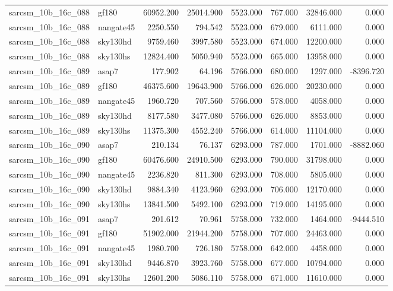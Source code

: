 \begin{tabular}{llrrrrrr}
sarcsm\_10b\_16c\_088 & gf180 & 60952.200 & 25014.900 & 5523.000 & 767.000 & 32846.000 & 0.000 \\
sarcsm\_10b\_16c\_088 & nangate45 & 2250.550 & 794.542 & 5523.000 & 679.000 & 6111.000 & 0.000 \\
sarcsm\_10b\_16c\_088 & sky130hd & 9759.460 & 3997.580 & 5523.000 & 674.000 & 12200.000 & 0.000 \\
sarcsm\_10b\_16c\_088 & sky130hs & 12824.400 & 5050.940 & 5523.000 & 665.000 & 13958.000 & 0.000 \\
sarcsm\_10b\_16c\_089 & asap7 & 177.902 & 64.196 & 5766.000 & 680.000 & 1297.000 & -8396.720 \\
sarcsm\_10b\_16c\_089 & gf180 & 46375.600 & 19643.900 & 5766.000 & 626.000 & 20230.000 & 0.000 \\
sarcsm\_10b\_16c\_089 & nangate45 & 1960.720 & 707.560 & 5766.000 & 578.000 & 4058.000 & 0.000 \\
sarcsm\_10b\_16c\_089 & sky130hd & 8177.580 & 3477.080 & 5766.000 & 626.000 & 8853.000 & 0.000 \\
sarcsm\_10b\_16c\_089 & sky130hs & 11375.300 & 4552.240 & 5766.000 & 614.000 & 11104.000 & 0.000 \\
sarcsm\_10b\_16c\_090 & asap7 & 210.134 & 76.137 & 6293.000 & 787.000 & 1701.000 & -8882.060 \\
sarcsm\_10b\_16c\_090 & gf180 & 60476.600 & 24910.500 & 6293.000 & 790.000 & 31798.000 & 0.000 \\
sarcsm\_10b\_16c\_090 & nangate45 & 2236.820 & 811.300 & 6293.000 & 708.000 & 5805.000 & 0.000 \\
sarcsm\_10b\_16c\_090 & sky130hd & 9884.340 & 4123.960 & 6293.000 & 706.000 & 12170.000 & 0.000 \\
sarcsm\_10b\_16c\_090 & sky130hs & 13841.500 & 5492.100 & 6293.000 & 719.000 & 14195.000 & 0.000 \\
sarcsm\_10b\_16c\_091 & asap7 & 201.612 & 70.961 & 5758.000 & 732.000 & 1464.000 & -9444.510 \\
sarcsm\_10b\_16c\_091 & gf180 & 51902.000 & 21944.200 & 5758.000 & 707.000 & 24463.000 & 0.000 \\
sarcsm\_10b\_16c\_091 & nangate45 & 1980.700 & 726.180 & 5758.000 & 642.000 & 4458.000 & 0.000 \\
sarcsm\_10b\_16c\_091 & sky130hd & 9446.870 & 3923.760 & 5758.000 & 677.000 & 10794.000 & 0.000 \\
sarcsm\_10b\_16c\_091 & sky130hs & 12601.200 & 5086.110 & 5758.000 & 671.000 & 11610.000 & 0.000 \\

\end{tabular}
